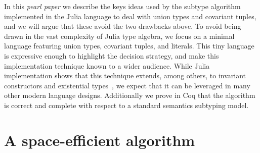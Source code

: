 \documentclass[a4paper,english]{lipics-v2019}
\begin{document}
In this \emph{pearl paper} we describe the keys ideas used by the
subtype algorithm implemented in the Julia language to deal with
union types and covariant tuples, and we will argue that these avoid the
two drawbacks above.  To avoid being drawn in the vast complexity of
Julia type algebra, we focus on a minimal language featuring union
types, covariant tuples, and literals.  This tiny language is
expressive enough to highlight the decision strategy, and make this
implementation technique known to a wider audience.  While Julia
implementation shows that this technique extends, among others, to
invariant constructors and existential
types~\cite{DBLP:NardelliBPCBV18}, we expect that it
can be leveraged in many other modern language designs.  Additionally
we prove in Coq that the algorithm is correct and complete with
respect to a standard semantics subtyping model.


\section{A space-efficient algorithm}
\end{document}
